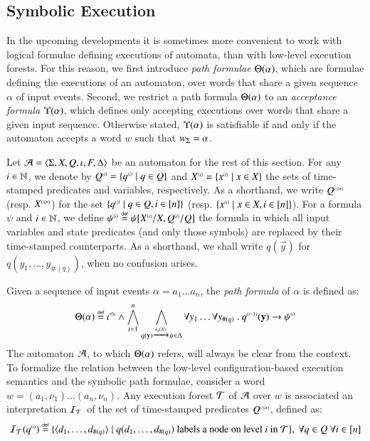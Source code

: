 \documentclass{llncs}
\begin{document}
\subsection{Symbolic Execution}

In the upcoming developments it is sometimes more convenient to work
with logical formulae defining executions of automata, than with
low-level execution forests. For this reason, we first introduce
\emph{path formulae} $\Theta({\alpha})$, which are formulae defining
the executions of an automaton, over words that share a given sequence
$\alpha$ of input events.  Second, we restrict a path formula
$\Theta({\alpha})$ to an \emph{acceptance formula}
$\Upsilon({\alpha})$, which defines only accepting executions over words
that share a given input sequence. Otherwise stated,
$\Upsilon({\alpha})$ is satisfiable if and only if the automaton accepts
a word $w$ such that ${w}_\Sigma = \alpha$.

Let $\mathcal{A} = \langle \Sigma,X,Q,\iota,F,\Delta \rangle$ be an automaton for the
rest of this section. For any $i \in {\bf \mathbb{N}}$, we denote by ${Q}^{\scriptscriptstyle{({i})}}
= \{ {q}^{\scriptscriptstyle{({i})}} \mid q \in Q \}$ and ${X}^{\scriptscriptstyle{({i})}} =
\{ {x}^{\scriptscriptstyle{({i})}} \mid x \in X \}$ the sets of time-stamped predicates
and variables, respectively. As a shorthand, we write ${Q}^{\scriptscriptstyle{({\leq
  n})}}$ (resp.  ${X}^{\scriptscriptstyle{({\leq n})}}$) for the set $\{ {q}^{\scriptscriptstyle{({i})}} \mid
  q \in Q, i \in [n] \}$ (resp. $\{ {x}^{\scriptscriptstyle{({i})}} \mid x \in X, i \in
  [n] \}$). For a formula $\psi$ and $i \in {\bf \mathbb{N}}$, we define
${\psi}^{\scriptscriptstyle{({i})}} \stackrel{\scriptscriptstyle{\mathsf{def}}}{=} \psi[{X}^{\scriptscriptstyle{({i})}}/X,{Q}^{\scriptscriptstyle{({i})}}/Q]$ the
formula in which all input variables and state predicates (and only
those symbols) are replaced by their time-stamped counterparts. As a
shorthand, we shall write $q(\vec{y})$ for $q(y_1,\ldots,y_{\#(q)})$,
when no confusion arises.

Given a sequence of input events $\alpha = a_1 \ldots a_n$, the
\emph{path formula} of $\alpha$ is defined as:
\begin{equation}\label{eq:pathform}
\Theta({\alpha}) \stackrel{\scriptscriptstyle{\mathsf{def}}}{=} {\iota}^{\scriptscriptstyle{({0})}} \wedge 
\bigwedge_{i=1}^n \bigwedge_{q(\mathbf y) \xrightarrow{{\scriptscriptstyle a_i(X)}}_{{\scriptstyle }}
  \psi \in \Delta} \forall y_1 \ldots \forall y_{\#(q)} ~.~
{q}^{\scriptscriptstyle{({i-1})}}(\mathbf y) \rightarrow {\psi}^{\scriptscriptstyle{({i})}}
\end{equation}
The automaton $\mathcal{A}$, to which $\Theta({\alpha})$ refers, will always
be clear from the context. To formalize the relation between the
low-level configuration-based execution semantics and the symbolic
path formulae, consider a word $w=(a_1,\nu_1) \ldots (a_n,\nu_n)$. Any
execution forest $\mathcal{T}$ of $\mathcal{A}$ over $w$ is associated an interpretation
$\mathcal{I}_{\mathcal{T}}$ of the set of time-stamped predicates ${Q}^{\scriptscriptstyle{({\leq n})}}$,
defined as:
\[\mathcal{I}_{\mathcal{T}}({q}^{\scriptscriptstyle{({i})}}) \stackrel{\scriptscriptstyle{\mathsf{def}}}{=} \{ \langle d_1,\ldots,d_{\#(q)} \rangle \mid
  q(d_1,\ldots,d_{\#(q)}) \text{ labels a node on level $i$ in $\mathcal{T}$} \} 
,~\forall q\in Q ~\forall i \in [n]\]
\end{document}
